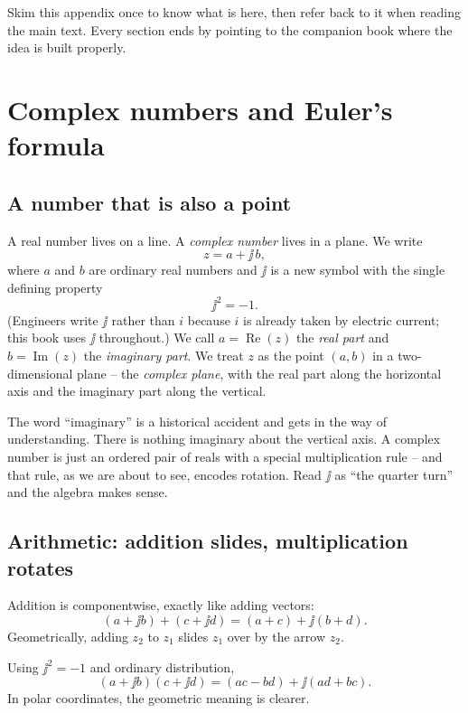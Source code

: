 \begin{focusbox}
Skim this appendix once to know what is here, then refer back to it when reading the main text. Every section ends by pointing to the companion book where the idea is built
properly.
\end{focusbox}

\section{Complex numbers and Euler's formula}
\label{ch42:complex}

\subsection{A number that is also a point}

A real number lives on a line. A \emph{complex number} lives in a plane. We write
\[
  z = a + \jj\,b,
\]
where $a$ and $b$ are ordinary real numbers and $\jj$ is a new symbol with the single defining
property
\[
  \jj^2 = -1.
\]
(Engineers write $\jj$ rather than $i$ because $i$ is already taken by electric current; this
book uses $\jj$ throughout.) We call $a = \operatorname{Re}(z)$ the \emph{real part} and $b =
\operatorname{Im}(z)$ the \emph{imaginary part}. We treat $z$ as the point $(a,b)$ in a two-dimensional plane -- the \emph{complex plane}, with the real part along the horizontal axis and the imaginary part along
the vertical.

\begin{intuitionbox}
The word ``imaginary'' is a historical accident and gets in the way of understanding. There is
nothing imaginary about the vertical axis. A complex number is just an ordered pair of reals with
a special multiplication rule -- and that rule, as we are about to see, encodes rotation. Read
$\jj$ as ``the quarter turn'' and the algebra makes sense.
\end{intuitionbox}

\subsection{Arithmetic: addition slides, multiplication rotates}

Addition is componentwise, exactly like adding vectors:
\[
  (a + \jj b) + (c + \jj d) = (a+c) + \jj(b+d).
\]
Geometrically, adding $z_2$ to $z_1$ slides $z_1$ over by the arrow $z_2$.

Using $\jj^2 = -1$ and ordinary distribution,
\[
  (a + \jj b)(c + \jj d) = (ac - bd) + \jj(ad + bc).
\]
In polar coordinates, the geometric meaning is clearer.

